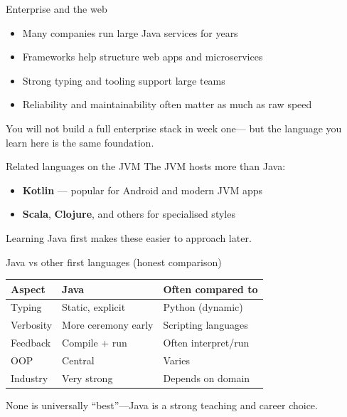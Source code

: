 \documentclass[aspectratio=169,11pt]{beamer}
\begin{document}
    \begin{frame}{Enterprise and the web}
        \begin{itemize}
            \item Many companies run large Java services for years
            \item Frameworks help structure web apps and microservices
            \item Strong typing and tooling support large teams
            \item Reliability and maintainability often matter as much as raw speed
        \end{itemize}
        \vspace{0.5em}
        You will not build a full enterprise stack in week one---
        but the language you learn here is the same foundation.
    \end{frame}

    \begin{frame}{Related languages on the JVM}
        The JVM hosts more than Java:
        \begin{itemize}
            \item \textbf{Kotlin} --- popular for Android and modern JVM apps
            \item \textbf{Scala}, \textbf{Clojure}, and others for specialised styles
        \end{itemize}
        \vspace{0.5em}
        Learning Java first makes these easier to approach later.
        \vspace{0.5em}
    \end{frame}

    \begin{frame}{Java vs other first languages (honest comparison)}
        \begin{tabular}{@{}lll@{}}
            \toprule
            \textbf{Aspect} & \textbf{Java} & \textbf{Often compared to} \\
            \midrule
            Typing & Static, explicit & Python (dynamic) \\
            Verbosity & More ceremony early & Scripting languages \\
            Feedback & Compile + run & Often interpret/run \\
            OOP & Central & Varies \\
            Industry & Very strong & Depends on domain \\
            \bottomrule
        \end{tabular}
        \vspace{0.6em}
        None is universally ``best''---Java is a strong teaching and career choice.
    \end{frame}
\end{document}

